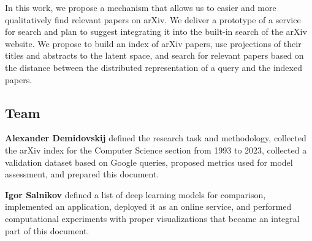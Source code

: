 \documentclass{article}
\begin{document}
    In this work, we propose a mechanism that allows us to easier and more qualitatively find relevant papers on arXiv. We deliver a prototype of a service for search and plan to suggest integrating it into the built-in search of the arXiv website. We propose to build an index of arXiv papers, use projections of their titles and abstracts to the latent space, and search for relevant papers based on the distance between the distributed representation of a query and the indexed papers.
    

    \subsection{Team}
        \textbf{Alexander Demidovskij} defined the research task and methodology, collected the arXiv index for the Computer Science section from 1993 to 2023, collected a validation dataset based on Google queries, proposed metrics used for model assessment, and prepared this document.

        \textbf{Igor Salnikov} defined a list of deep learning models for comparison, implemented an application, deployed it as an online service, and performed computational experiments with proper visualizations that became an integral part of this document.
\end{document}
